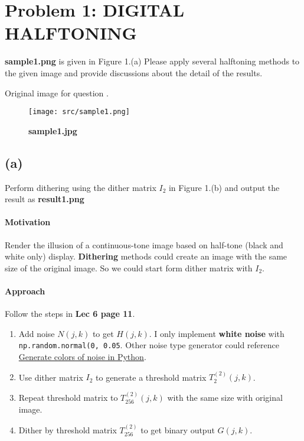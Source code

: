\section{Problem 1: DIGITAL HALFTONING}\label{problem-1-digital-halftoning}
\textbf{sample1.png} is given in Figure 1.(a) Please apply several halftoning methods to the given image and provide discussions about the detail of the results.

Original image  for question .
\begin{figure}
    \centering
    \texttt{[image: src/sample1.png]}
    \caption{\textbf{sample1.jpg}}
    \label{sample1}
\end{figure}

\subsection{(a)}\label{1_a}
Perform dithering using the dither matrix \(I_{2}\) in Figure 1.(b) and output the result as \textbf{result1.png}

\paragraph{Motivation}
Render the illusion of a continuous-tone image based on half-tone (black and white only) display. \textbf{Dithering} methods could create an image with the same size of the original image. So we could start form dither matrix with \(I_{2}\).

\paragraph{Approach}
Follow the steps in \textbf{Lec 6 page 11}.
\begin{enumerate}
    \item Add noise \(N(j, k)\) to get \(H(j, k)\). I only implement \textbf{white noise} with \texttt{np.random.normal(0, 0.05}. Other noise type generator could reference \href{https://stackoverflow.com/questions/67085963/generate-colors-of-noise-in-python}{Generate colors of noise in Python}.
    \item Use dither matrix \(I_{2}\) to generate a threshold matrix \(T^{(2)}_{2}(j, k)\).
    \item Repeat threshold matrix to \(T^{(2)}_{256}(j, k)\) with the same size with original image.
    \item Dither by threshold matrix \(T^{(2)}_{256}\) to get binary output \(G(j, k)\).
\end{enumerate}


